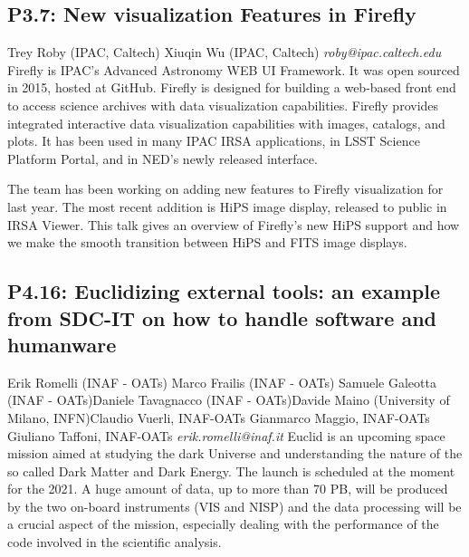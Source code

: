 \documentclass{report}
\begin{document}
\subsection*{P3.7: New visualization Features in Firefly}
\bigskip
Trey Roby (IPAC, Caltech) \newline Xiuqin Wu (IPAC, Caltech) \newline   \newline   \newline  \newline  \newline\newline
{\it roby@ipac.caltech.edu}\newline
\newline\newline
Firefly is IPAC's Advanced Astronomy WEB UI Framework. It was  open sourced in 2015, hosted at GitHub. Firefly is designed for building a web-based front end to access science archives  with data visualization capabilities. Firefly provides integrated interactive data visualization capabilities with images, catalogs, and plots.  It has been used in many IPAC IRSA applications, in LSST Science Platform Portal, and in NED’s newly released interface.

The team has been working on adding new features to Firefly visualization for last year. The most recent addition is HiPS image display, released to public in IRSA Viewer. This talk gives an overview of Firefly's new HiPS support and how we make the smooth transition between HiPS and FITS image displays.\newline
\newpage
\subsection*{P4.16: Euclidizing external tools: an example from SDC-IT on how to handle software and humanware}
\bigskip
Erik Romelli (INAF - OATs) \newline Marco Frailis (INAF - OATs) \newline  Samuele Galeotta (INAF - OATs)\newline  Daniele Tavagnacco (INAF - OATs)\newline Davide Maino (University of Milano, INFN)\newline  Claudio Vuerli, INAF-OATs
Gianmarco Maggio, INAF-OATs
Giuliano Taffoni, INAF-OATs\newline\newline
{\it erik.romelli@inaf.it}\newline
\newline\newline
Euclid is an upcoming space mission aimed at studying the dark Universe and understanding the nature of the so called Dark Matter and Dark Energy. The launch is scheduled at the moment  for the 2021. A huge amount of data, up to more than 70 PB, will be produced by the two on-board instruments (VIS and NISP) and the data processing will be a crucial aspect of the mission, especially dealing with the performance of the code involved in the scientific analysis. 
\end{document}

